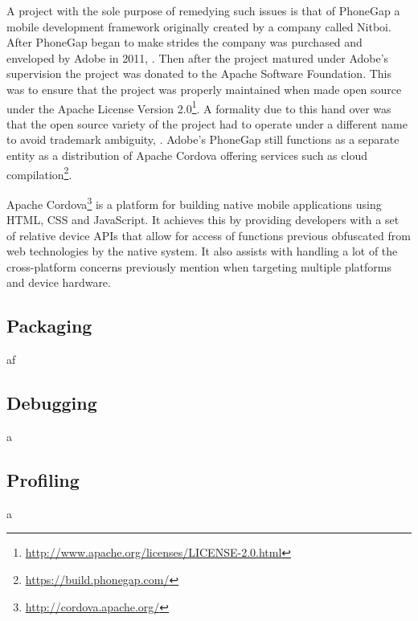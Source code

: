 \documentclass[final]{cmpreport}
\begin{document}
A project with the sole purpose of remedying such issues is that of PhoneGap a mobile development framework originally created by a company called Nitboi. After PhoneGap began to make strides the company was purchased and enveloped by Adobe in 2011, \cite{Adobe}. Then after the project matured under Adobe's supervision the project was donated to the Apache Software Foundation. This was to ensure that the project was properly maintained when made open source under the Apache License Version 2.0\footnote{\url{http://www.apache.org/licenses/LICENSE-2.0.html}}. A formality due to this hand over was that the open source variety of the project had to operate under a different name to avoid trademark ambiguity, \cite{Leroux}. Adobe's PhoneGap still functions as a separate entity as a distribution of Apache Cordova offering services such as cloud compilation\footnote{\url{https://build.phonegap.com/}}.

Apache Cordova\footnote{\url{http://cordova.apache.org/}} is a platform for building native mobile applications using HTML, CSS and JavaScript. It achieves this by providing developers with a set of relative device APIs that allow for access of functions previous obfuscated from web technologies by the native system. It also assists with handling a lot of the cross-platform concerns previously mention when targeting multiple platforms and device hardware.

\subsection{Packaging}
af

\subsection{Debugging}
a

\subsection{Profiling}
a


\clearpage

\end{document}
